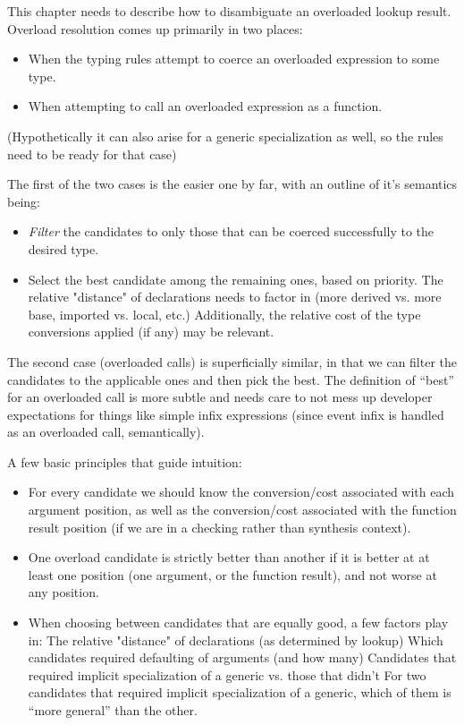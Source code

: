 
\begin{TODO}

This chapter needs to describe how to disambiguate an overloaded lookup result.
Overload resolution comes up primarily in two places:

\begin{itemize}
\item When the typing rules attempt to coerce an overloaded expression to some type.
\item When attempting to call an overloaded expression as a function.
\end{itemize}

(Hypothetically it can also arise for a generic specialization  as well, so the rules need to be ready for that case)

The first of the two cases is the easier one by far, with an outline of it's semantics being:

\begin{itemize}
\item \emph{Filter} the candidates to only those that can be coerced successfully to the desired type.
\item Select the best candidate among the remaining ones, based on priority.
\subitem The relative "distance" of declarations needs to factor in (more derived vs. more base, imported vs. local, etc.)
\subitem Additionally, the relative cost of the type conversions applied (if any) may be relevant.
\end{itemize}

The second case (overloaded calls) is superficially similar, in that we can filter the candidates to the applicable ones and then pick the best.
The definition of ``best'' for an overloaded call is more subtle and needs care to not mess up developer expectations for things like simple infix expressions (since event infix  is handled as an overloaded call, semantically).

A few basic principles that guide intuition:

\begin{itemize}
\item For every candidate we should know the conversion/cost associated with each argument position, as well as the conversion/cost associated with the function result position (if we are in a checking rather than synthesis context).
\item One overload candidate is strictly better than another if it is better at at least one position (one argument, or the function result), and not worse at any position.
\item When choosing between candidates that are equally good, a few factors play in:
\subitem The relative "distance" of declarations (as determined by lookup)
\subitem Which candidates required defaulting of arguments (and how many)
\subitem Candidates that required implicit specialization of a generic vs. those that didn't
\subitem For two candidates that required implicit specialization of a generic, which of them is ``more general'' than the other.
\end{itemize}


\end{TODO}
